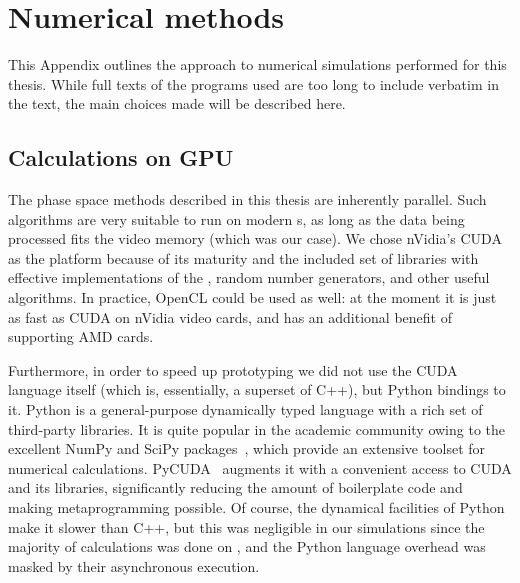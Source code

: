 \chapter{Numerical methods}
\label{cha:appendix:numerical}

This Appendix outlines the approach to numerical simulations performed for this thesis.
While full texts of the programs used are too long to include verbatim in the text, the main choices made will be described here.


\section{Calculations on GPU}

The phase space methods described in this thesis are inherently parallel.
Such algorithms are very suitable to run on modern s, as long as the data being processed fits the video memory (which was our case).
We chose nVidia's CUDA as the  platform because of its maturity and the included set of libraries with effective implementations of the , random number generators, and other useful algorithms.
In practice, OpenCL could be used as well: at the moment it is just as fast as CUDA on nVidia video cards, and has an additional benefit of supporting AMD cards.

Furthermore, in order to speed up prototyping we did not use the CUDA language itself (which is, essentially, a superset of C++), but Python bindings to it.
Python is a general-purpose dynamically typed language with a rich set of third-party libraries.
It is quite popular in the academic community owing to the excellent NumPy and SciPy packages~\cite{Oliphant2007}, which provide an extensive toolset for numerical calculations.
PyCUDA~\cite{Klockner2012} augments it with a convenient access to CUDA and its libraries, significantly reducing the amount of boilerplate code and making metaprogramming possible.
Of course, the dynamical facilities of Python make it slower than C++, but this was negligible in our simulations since the majority of calculations was done on , and the Python language overhead was masked by their asynchronous execution.

